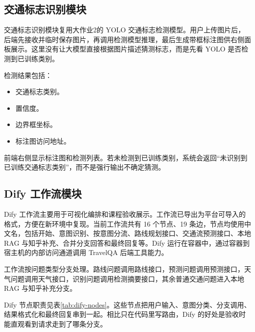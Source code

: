 \documentclass[bwprint]{report}
\begin{document}
\subsection{交通标志识别模块}
交通标志识别模块复用大作业2的 YOLO 交通标志检测模型。用户上传图片后，后端先接收并临时保存图片，再调用检测模型推理，最后生成带框标注图供右侧面板展示。这里没有让大模型直接根据图片描述猜测标志，而是先看 YOLO 是否检测到已训练类别。

检测结果包括：
\begin{itemize}
    \item 交通标志类别。
    \item 置信度。
    \item 边界框坐标。
    \item 标注图访问地址。
\end{itemize}

前端右侧显示标注图和检测列表。若未检测到已训练类别，系统会返回``未识别到已训练交通标志类别''，而不是强行输出不确定猜测。

\subsection{Dify 工作流模块}
Dify 工作流主要用于可视化编排和课程验收展示。工作流已导出为平台可导入的格式，方便在新环境中复现。当前工作流共有 16 个节点、19 条边，节点均使用中文名，包括开始、意图识别、按意图分流、路线规划接口、交通流预测接口、本地 RAG 与知乎补充、合并分支回答和最终回复等。Dify 运行在容器中，通过容器到宿主机的内部访问通道调用 TravelQA 后端工具能力。

工作流按问题类型分支处理。路线问题调用路线接口，预测问题调用预测接口，天气问题调用天气接口，识别问题调用检测摘要接口，其余普通交通问题进入本地 RAG 与知乎补充分支。

Dify 节点职责见表\ref{tab:dify-nodes}。这些节点把用户输入、意图分类、分支调用、结果格式化和最终回复串到一起。相比只在代码里写路由，Dify 的好处是验收时能直观看到请求走到了哪条分支。
\end{document}
